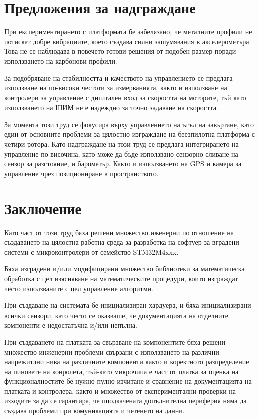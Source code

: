 \section{Предложения за надграждане}

При експериментирането с платформата бе забелязано,
че металните профили не потискат добре вибрациите, което създава силни зашумявания в акселерометъра.
Това не се наблюдава в повечето готови решения от подобен размер поради използването на карбонови профили.

За подобряване на стабилността и качеството на управлението се предлага използване на по-високи честоти за измерванията,
както и използване на контролери за управление с дигитален вход за  скоростта на моторите,
тъй като използването на ШИМ не е надеждно за точно задаване на скоростта.

За момента този труд се фокусира върху управлението на ъгъл на завъртане, като един от основните проблеми за цялостно изграждане на беезпилотна платформа с четири ротора.
Като надграждане на този труд се предлага интегрирането на управление по височина, като може да бъде използвано сензорно сливане на сензор за разстояние, и барометър.
Както и използването на GPS и камера за управление чрез позициониране в пространството.

\section{Заключение}

Като част от този труд бяха решени множество иженерни по отношение на създаването на цялостна работна среда за разработка на
софтуер за вградени системи с микроконтролери от семейство STM32M4xxx.

Бяха изградени и/или модифицирани множество библиотеки за математическа обработка с цел изясняване на математическите процедури,
които изграждат често използваните с цел управление алгоритми.

При създаване на системата бе инициализиран хардуера, и бяха инициализирани всички сензори, като често се оказваше,
че документацията на отделните компоненти е недостатъчна и/или непълна.

При създаването на платката за свързване на компонентите бяха решени множество инженерни проблеми свързани с използването на
различни напрежитлни нива на различните компоненти както и коректното разпределение на пиновете на конролета, тъй-като 
микрочипа е част от платка за оценка на функционалностите бе нужно пулно изчитане и сравнение на документацията на платката и контролера,
както и множество от експериментални проверки на изходите за да се гарантира, че пподкачената допълнителна периферия няма да създава проблеми
при комуникацията и четенето на данни.

